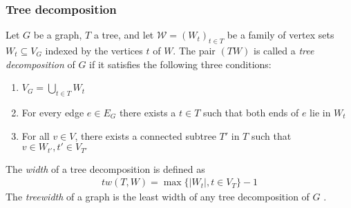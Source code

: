 \subsubsection{Tree decomposition}
Let $G$ be a graph, $T$ a tree, and let $\mathcal{W} = \left(W_t\right)_{t\in T}$ be a family of vertex sets $W_t \subseteq V_G$ indexed by the vertices $t$ of $W$. The pair $(TW)$ is called a \emph{tree decomposition} of $G$ if it satisfies the following three conditions:
\begin{enumerate}
	\item $V_G = \bigcup_{t\in T}W_t$
	\item For every edge $e\in E_G$ there exists a $t\in T$ such that both ends of $e$ lie in $W_t$
	\item For all $v\in V$, there exists a connected subtree $T'$ in $T$ such that $v \in W_{t'}, t' \in V_{T'}$
\end{enumerate}
\cite[P. 319]{Diestel_GraphTheory}
The \emph{width} of a tree decomposition is defined as 
\begin{align}
	tw(T,W) = \max\{ |W_t|,t\in V_T \} -1
\end{align}
The \emph{treewidth} of a graph is the least width of any tree decomposition of $G$ \cite[P. 321]{Diestel_GraphTheory}.
